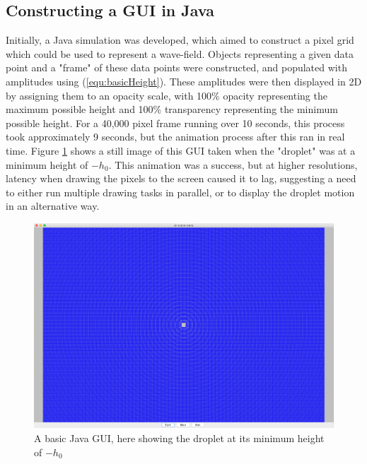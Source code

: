 \subsection{Constructing a GUI in Java}
Initially, a Java simulation was developed, which aimed to construct a pixel grid which could be used to represent a wave-field. Objects representing a given data point and a "frame" of these data points were constructed, and populated with amplitudes using (\ref{equ:basicHeight}). These amplitudes were then displayed in 2D by assigning them to an opacity scale, with 100\% opacity representing the maximum possible height and 100\% transparency representing the minimum possible height. For a 40,000 pixel frame running over 10 seconds, this process took approximately 9 seconds, but the animation process after this ran in real time. Figure \ref{fig:javaBasicHeight} shows a still image of this GUI taken when the "droplet" was at a minimum height of $-h_0$. This animation was a success, but at higher resolutions, latency when drawing the pixels to the screen caused it to lag, suggesting a need to either run multiple drawing tasks in parallel, or to display the droplet motion in an alternative way.

\begin{figure}
    \centering
    \includegraphics[width=\textwidth]{simulation/javaMaxHeight.png}
    \caption{A basic Java GUI, here showing the droplet at its minimum height of $-h_0$}
    \label{fig:javaBasicHeight}
\end{figure}

